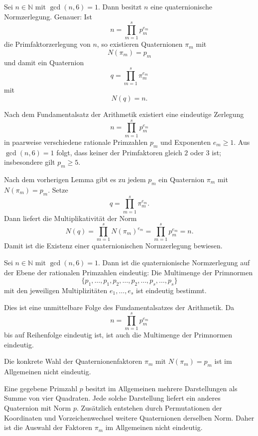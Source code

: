 \begin{satz}
	Sei $n\in\mathbb N$ mit $\gcd(n,6)=1$. Dann besitzt $n$ eine quaternionische Normzerlegung.
	Genauer: Ist
	\[
	n=\prod_{m=1}^s p_m^{e_m}
	\]
	die Primfaktorzerlegung von $n$, so existieren Quaternionen $\pi_m$ mit
	\[
	N(\pi_m)=p_m
	\]
	und damit ein Quaternion
	\[
	q=\prod_{m=1}^s \pi_m^{e_m}
	\]
	mit
	\[
	N(q)=n.
	\]
\end{satz}

\begin{beweis}
	Nach dem Fundamentalsatz der Arithmetik existiert eine eindeutige Zerlegung
	\[
	n=\prod_{m=1}^s p_m^{e_m}
	\]
	in paarweise verschiedene rationale Primzahlen $p_m$ und Exponenten $e_m\ge 1$.
	Aus $\gcd(n,6)=1$ folgt, dass keiner der Primfaktoren gleich $2$ oder $3$ ist; insbesondere gilt $p_m\ge 5$.
	
	Nach dem vorherigen Lemma gibt es zu jedem $p_m$ ein Quaternion $\pi_m$ mit $N(\pi_m)=p_m$.
	Setze
	\[
	q=\prod_{m=1}^s \pi_m^{e_m}.
	\]
	Dann liefert die Multiplikativität der Norm
	\[
	N(q)=\prod_{m=1}^s N(\pi_m)^{e_m}
	=\prod_{m=1}^s p_m^{e_m}
	=n.
	\]
	Damit ist die Existenz einer quaternionischen Normzerlegung bewiesen.
\end{beweis}

\begin{satz}
	Sei $n\in\mathbb N$ mit $\gcd(n,6)=1$. Dann ist die quaternionische Normzerlegung auf der Ebene der rationalen Primzahlen eindeutig: Die Multimenge der Primnormen
	\[
	\{p_1,\dots,p_1,p_2,\dots,p_2,\dots,p_s,\dots,p_s\}
	\]
	mit den jeweiligen Multiplizitäten $e_1,\dots,e_s$ ist eindeutig bestimmt.
\end{satz}

\begin{beweis}
	Dies ist eine unmittelbare Folge des Fundamentalsatzes der Arithmetik. Da
	\[
	n=\prod_{m=1}^s p_m^{e_m}
	\]
	bis auf Reihenfolge eindeutig ist, ist auch die Multimenge der Primnormen eindeutig.
\end{beweis}

\begin{satz}
	Die konkrete Wahl der Quaternionenfaktoren $\pi_m$ mit $N(\pi_m)=p_m$ ist im Allgemeinen nicht eindeutig.
\end{satz}

\begin{beweis}
	Eine gegebene Primzahl $p$ besitzt im Allgemeinen mehrere Darstellungen als Summe von vier Quadraten. Jede solche Darstellung liefert ein anderes Quaternion mit Norm $p$. Zusätzlich entstehen durch Permutationen der Koordinaten und Vorzeichenwechsel weitere Quaternionen derselben Norm. Daher ist die Auswahl der Faktoren $\pi_m$ im Allgemeinen nicht eindeutig.
\end{beweis}

